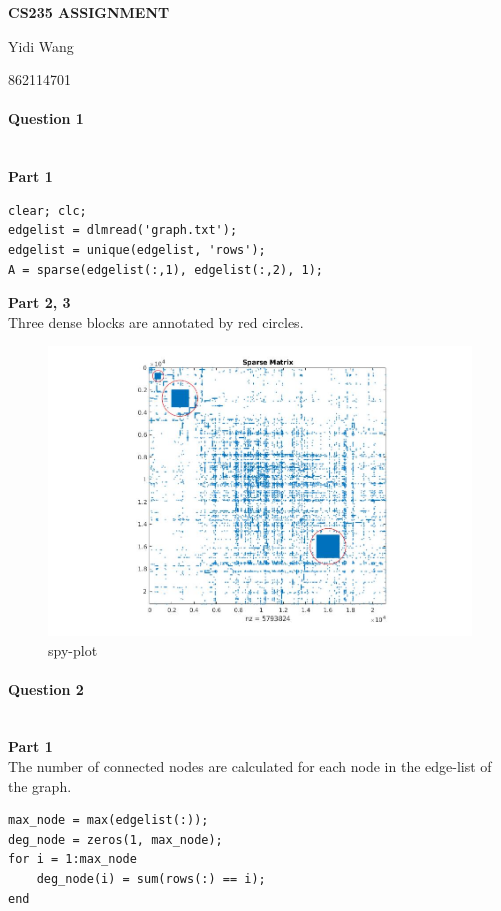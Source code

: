 \documentclass[11pt]{article}
\begin{document}
\centerline{\large \bf CS235 ASSIGNMENT}
\centerline{Yidi Wang}
\centerline{862114701}

\vskip 0.1in


\paragraph{Question 1}\mbox{} \\
\noindent
\textbf{Part 1}
\begin{verbatim}
clear; clc;
edgelist = dlmread('graph.txt');
edgelist = unique(edgelist, 'rows');
A = sparse(edgelist(:,1), edgelist(:,2), 1);
\end{verbatim}

\noindent
\textbf{Part 2, 3} \\
Three dense blocks are annotated by red circles.
\begin{figure}[!h]
    \centering
    \includegraphics[width=\linewidth]{figs/q1.jpg}
    \caption{spy-plot}
    \label{fig::spy}
\end{figure}

\paragraph{Question 2}\mbox{} \\
\noindent
\textbf{Part 1} \\
The number of connected nodes are calculated for each node in the edge-list of the graph.
\begin{verbatim}
max_node = max(edgelist(:));
deg_node = zeros(1, max_node);
for i = 1:max_node
    deg_node(i) = sum(rows(:) == i);
end
\end{verbatim}
\end{document}

